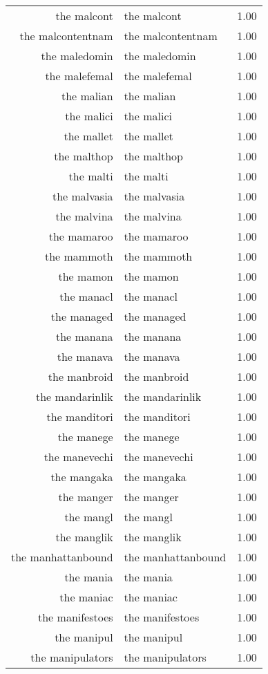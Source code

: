 \begin{table}[ht]
\begin{tabular}{rlr}
  the malcont & the malcont & 1.00 \\ 
  the malcontentnam & the malcontentnam & 1.00 \\ 
  the maledomin & the maledomin & 1.00 \\ 
  the malefemal & the malefemal & 1.00 \\ 
  the malian & the malian & 1.00 \\ 
  the malici & the malici & 1.00 \\ 
  the mallet & the mallet & 1.00 \\ 
  the malthop & the malthop & 1.00 \\ 
  the malti & the malti & 1.00 \\ 
  the malvasia & the malvasia & 1.00 \\ 
  the malvina & the malvina & 1.00 \\ 
  the mamaroo & the mamaroo & 1.00 \\ 
  the mammoth & the mammoth & 1.00 \\ 
  the mamon & the mamon & 1.00 \\ 
  the manacl & the manacl & 1.00 \\ 
  the managed & the managed & 1.00 \\ 
  the manana & the manana & 1.00 \\ 
  the manava & the manava & 1.00 \\ 
  the manbroid & the manbroid & 1.00 \\ 
  the mandarinlik & the mandarinlik & 1.00 \\ 
  the manditori & the manditori & 1.00 \\ 
  the manege & the manege & 1.00 \\ 
  the manevechi & the manevechi & 1.00 \\ 
  the mangaka & the mangaka & 1.00 \\ 
  the manger & the manger & 1.00 \\ 
  the mangl & the mangl & 1.00 \\ 
  the manglik & the manglik & 1.00 \\ 
  the manhattanbound & the manhattanbound & 1.00 \\ 
  the mania & the mania & 1.00 \\ 
  the maniac & the maniac & 1.00 \\ 
  the manifestoes & the manifestoes & 1.00 \\ 
  the manipul & the manipul & 1.00 \\ 
  the manipulators & the manipulators & 1.00 \\ 

\end{tabular}
\end{table}
